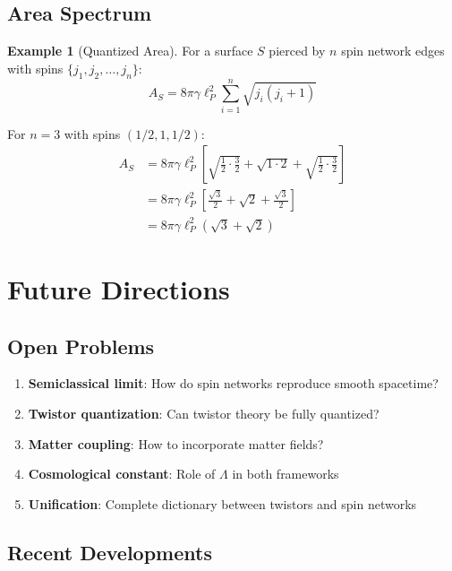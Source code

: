 \documentclass[12pt,a4paper]{article}
\theoremstyle{definition}
\newtheorem{example}{Example}[section]
\begin{document}
\subsection{Area Spectrum}

\begin{example}[Quantized Area]
For a surface $S$ pierced by $n$ spin network edges with spins $\{j_1, j_2, \ldots, j_n\}$:
\begin{equation}
A_S = 8\pi\gamma\ell_P^2 \sum_{i=1}^n \sqrt{j_i(j_i+1)}
\end{equation}

For $n=3$ with spins $(1/2, 1, 1/2)$:
\begin{align}
A_S &= 8\pi\gamma\ell_P^2 \left[\sqrt{\frac{1}{2} \cdot \frac{3}{2}} + \sqrt{1 \cdot 2} + \sqrt{\frac{1}{2} \cdot \frac{3}{2}}\right] \\
&= 8\pi\gamma\ell_P^2 \left[\frac{\sqrt{3}}{2} + \sqrt{2} + \frac{\sqrt{3}}{2}\right] \\
&= 8\pi\gamma\ell_P^2 (\sqrt{3} + \sqrt{2})
\end{align}
\end{example}

\section{Future Directions}

\subsection{Open Problems}

\begin{enumerate}
    \item \textbf{Semiclassical limit}: How do spin networks reproduce smooth spacetime?
    \item \textbf{Twistor quantization}: Can twistor theory be fully quantized?
    \item \textbf{Matter coupling}: How to incorporate matter fields?
    \item \textbf{Cosmological constant}: Role of $\Lambda$ in both frameworks
    \item \textbf{Unification}: Complete dictionary between twistors and spin networks
\end{enumerate}

\subsection{Recent Developments}
\end{document}
